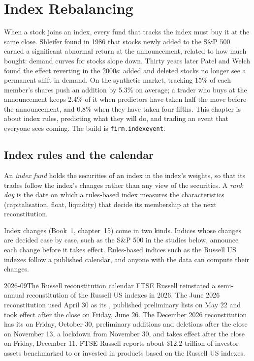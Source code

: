 \chapter{Index Rebalancing}\label{ch:s1:index-rebalancing}

When a stock joins an index, every fund that tracks the index must buy it at the same close. Shleifer found in 1986 that stocks newly added to the S\&P 500
earned a significant abnormal return at the announcement, related to how much  bought: demand curves for stocks slope down. Thirty years later
Patel and Welch found the effect reverting in the 2000s: added and deleted stocks no longer see a permanent shift in demand. On the synthetic market,  tracking 15\% of each member's shares push an addition by 5.3\% on average; a trader who buys at the announcement keeps 2.4\% of it when predictors
have taken half the move before the announcement, and 0.8\% when they have taken four fifths. This chapter is about index rules, predicting what they will
do, and trading an event that everyone sees coming. The build is \texttt{firm.indexevent}.

\section{Index rules and the calendar}

\begin{definition}\label{def:s1:index-rebalancing:fund}
An \emph{index fund} holds the securities of an index in the index's weights, so that its trades follow the index's changes rather than
any view of the securities. A \emph{rank day} is the date on which a rules-based index measures the characteristics (capitalisation, float,
liquidity) that decide its membership at the next reconstitution.
\end{definition}

Index changes (Book~1, chapter~15) come in two kinds. Indices whose changes are decided case by case, such as the S\&P 500 in the studies below, announce each change before it takes
effect.
Rules-based indices such as the Russell US indexes follow a published calendar, and anyone with the data can compute their changes.

\begin{dated}{2026-09}{The Russell reconstitution calendar}\label{dat:s1:index-rebalancing:russell}
FTSE Russell reinstated a semi-annual reconstitution of the Russell US indexes in 2026. The June 2026 reconstitution used April 30 as its ,
published preliminary lists on May 22 and took effect after the close on Friday, June 26. The December 2026 reconstitution has its  on Friday,
October 30, preliminary additions and deletions after the close on November 13, a lockdown from November 30, and takes effect after the close on Friday,
December 11. FTSE Russell reports about \$12.2 trillion of investor assets benchmarked to or invested in products based on the Russell US indexes.
\end{dated}

